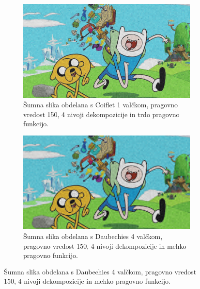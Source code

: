 \documentclass[a4paper,11pt]{article}
\begin{document}
\begin{figure}
\begin{subfigure}[t]{0.48\textwidth}
\includegraphics[width=1\textwidth]{images/report/noisy_nrmse_comp.jpg}
\caption{Šumna slika obdelana s Coiflet 1 valčkom, pragovno vredost 150, 4 nivoji dekompozicije in trdo pragovno funkcijo.} \label{noisy:comp:nrmse}
\end{subfigure}
\hspace*{\fill} %
\begin{subfigure}[t]{0.48\textwidth}
\includegraphics[width=1\textwidth]{images/report/noisy_pearson_comp.jpg}
\caption{Šumna slika obdelana s Daubechies 4 valčkom, pragovno vredost 150, 4 nivoji dekompozicije in mehko pragovno funkcijo.} \label{noisy:comp:pearson}
\end{subfigure}
\label{noisy:cmp}
\end{figure}
\end{document}
